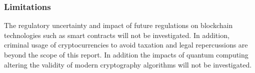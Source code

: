 \subsubsection{Limitations}

The regulatory uncertainty and impact of future regulations on \gls{blockchain} technologies such as \glspl{smart contract} will not be investigated. In addition, criminal usage of cryptocurrencies to avoid taxation and legal repercussions are beyond the scope of this report. In addition the impacts of quantum computing altering the validity of modern cryptography algorithms will not be investigated.

\newpage  
